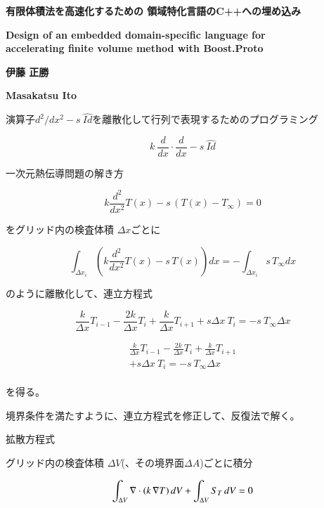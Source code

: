 \documentclass[a4j,11pt]{jarticle}
\begin{document}
\renewcommand{\baselinestretch}{1.12}\small\normalsize
\begin{center}
  \textbf{\Large 有限体積法を高速化するための 領域特化言語のC++への埋め込み}
  
  \textbf{\large Design of an embedded domain-specific language for\\ 
accelerating finite volume method with Boost.Proto}
\end{center}
\begin{center}  
  \textbf{伊藤 正勝}

  \textbf{Masakatsu Ito}

\end{center}

演算子\(  d^2 / dx^2 - s\ \hat{Id} \)を離散化して行列で表現するためのプログラミング

\[ k \ \frac{d}{dx} \cdot  \frac{d}{dx} - s\ \hat{Id}  \]


一次元熱伝導問題の解き方

\[ k \frac{d^2}{dx^2} T(x) - s \, ( T(x) - T_\infty ) = 0    \]

をグリッド内の検査体積 \(\Delta x\)ごとに

\[ \int_{\Delta x_i} \left(  k \frac{d^2}{dx^2} T(x) - s \, T(x)   \right) dx =  - \int_{\Delta x_i} s \, T_\infty dx  \]

のように離散化して、連立方程式

\[ \frac{k}{\Delta x} T_{i-1} - \frac{2 k}{\Delta x}T_i +  \frac{k}{\Delta x} T_{i+1} + s  \Delta x\ T_i =  - s\ T_\infty \Delta x   \]


\begin{eqnarray}
\frac{k}{\Delta x} T_{i-1} - \frac{2 k}{\Delta x}T_i +  \frac{k}{\Delta x} T_{i+1}    \\
 +  s  \Delta x\ T_i  =  - s\ T_\infty \Delta x  \\
\end{eqnarray}


を得る。


境界条件を満たすように、連立方程式を修正して、反復法で解く。



拡散方程式

グリッド内の検査体積 \(\Delta V\)(、その境界面\(\Delta A\))ごとに積分


\[ \int_{\Delta V} {\bf \nabla} \cdot ( k \,  {\bf \nabla} T )\, dV + \int_{\Delta V} S_T \,dV  = 0 \]
\end{document}
